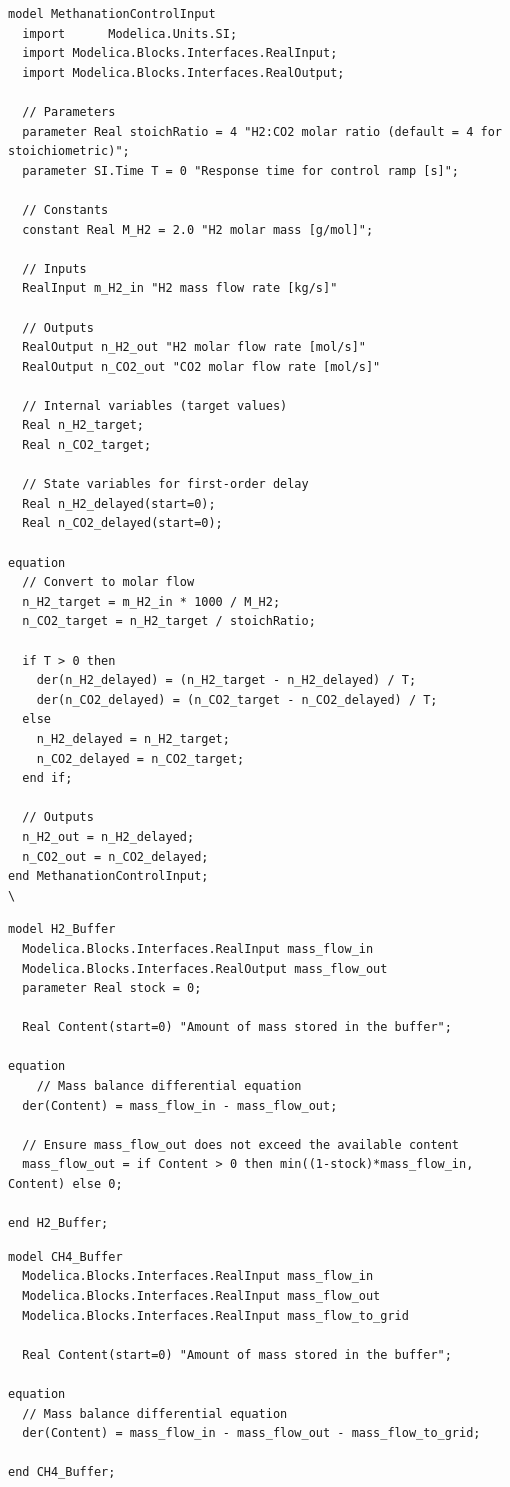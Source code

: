 \newpage
\begin{lstlisting}[language=Modelica, caption= Methanation Control Input]
  model MethanationControlInput
  import      Modelica.Units.SI;
  import Modelica.Blocks.Interfaces.RealInput;
  import Modelica.Blocks.Interfaces.RealOutput;

  // Parameters
  parameter Real stoichRatio = 4 "H2:CO2 molar ratio (default = 4 for stoichiometric)";
  parameter SI.Time T = 0 "Response time for control ramp [s]";

  // Constants
  constant Real M_H2 = 2.0 "H2 molar mass [g/mol]";

  // Inputs
  RealInput m_H2_in "H2 mass flow rate [kg/s]"

  // Outputs
  RealOutput n_H2_out "H2 molar flow rate [mol/s]"
  RealOutput n_CO2_out "CO2 molar flow rate [mol/s]"

  // Internal variables (target values)
  Real n_H2_target;
  Real n_CO2_target;

  // State variables for first-order delay
  Real n_H2_delayed(start=0);
  Real n_CO2_delayed(start=0);

equation 
  // Convert to molar flow
  n_H2_target = m_H2_in * 1000 / M_H2;
  n_CO2_target = n_H2_target / stoichRatio;

  if T > 0 then
    der(n_H2_delayed) = (n_H2_target - n_H2_delayed) / T;
    der(n_CO2_delayed) = (n_CO2_target - n_CO2_delayed) / T;
  else
    n_H2_delayed = n_H2_target;
    n_CO2_delayed = n_CO2_target;
  end if;

  // Outputs
  n_H2_out = n_H2_delayed;
  n_CO2_out = n_CO2_delayed;
end MethanationControlInput;
\
\end{lstlisting}
\newpage
\begin{lstlisting}[language=Modelica, caption= H2 Buffer]
  model H2_Buffer
  Modelica.Blocks.Interfaces.RealInput mass_flow_in
  Modelica.Blocks.Interfaces.RealOutput mass_flow_out
  parameter Real stock = 0;

  Real Content(start=0) "Amount of mass stored in the buffer";

equation 
    // Mass balance differential equation
  der(Content) = mass_flow_in - mass_flow_out;

  // Ensure mass_flow_out does not exceed the available content
  mass_flow_out = if Content > 0 then min((1-stock)*mass_flow_in, Content) else 0;

end H2_Buffer;
\end{lstlisting}

\begin{lstlisting}[language=Modelica, caption= CH4 Buffer]
  model CH4_Buffer
  Modelica.Blocks.Interfaces.RealInput mass_flow_in
  Modelica.Blocks.Interfaces.RealInput mass_flow_out
  Modelica.Blocks.Interfaces.RealInput mass_flow_to_grid

  Real Content(start=0) "Amount of mass stored in the buffer";

equation 
  // Mass balance differential equation
  der(Content) = mass_flow_in - mass_flow_out - mass_flow_to_grid;

end CH4_Buffer;
\end{lstlisting}

